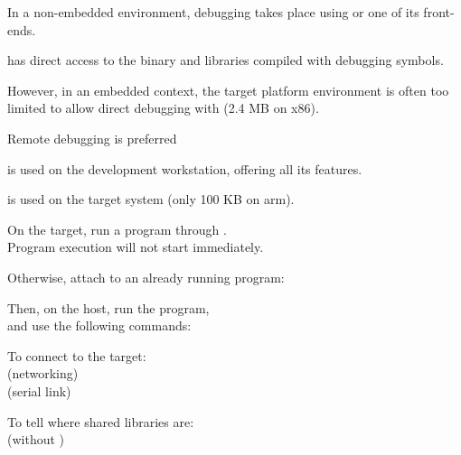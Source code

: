   \startitemize
  \item In a non-embedded environment, debugging takes place using 
    or one of its front-ends.
  \item {} has direct access to the binary and libraries compiled
    with debugging symbols.
  \item However, in an embedded context, the target platform
    environment is often too limited to allow direct debugging with
     (2.4 MB on x86).
  \item Remote debugging is preferred
    \startitemize
    \item {} is used on the development workstation, offering
      all its features.
    \item {} is used on the target system (only 100 KB
      on arm).
    \stopitemize
  \stopitemize


  \startitemize
  \item On the target, run a program through .\\
    Program execution will not start immediately.\\
  \item Otherwise, attach  to an already running program:\\
  \item Then, on the host, run the  program,\\
    and use the following  commands:
    \startitemize
    \item To connect to the target:\\
       (networking)\\
       (serial link)
    \item To tell  where shared libraries are:\\
       (without )
    \stopitemize
  \stopitemize

